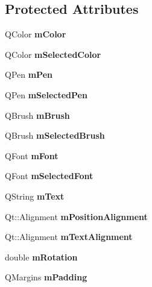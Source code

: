 \subsection*{Protected Attributes}
\begin{DoxyCompactItemize}
\item 
\hypertarget{class_q_c_p_item_text_a8407f284ad867f627878cc26ef433d08}{}\label{class_q_c_p_item_text_a8407f284ad867f627878cc26ef433d08} 
Q\+Color {\bfseries m\+Color}
\item 
\hypertarget{class_q_c_p_item_text_a7eb64e42f5f7998a97d8907ad25933c1}{}\label{class_q_c_p_item_text_a7eb64e42f5f7998a97d8907ad25933c1} 
Q\+Color {\bfseries m\+Selected\+Color}
\item 
\hypertarget{class_q_c_p_item_text_aa02388705dbbff1bf7b8aa872b5f579c}{}\label{class_q_c_p_item_text_aa02388705dbbff1bf7b8aa872b5f579c} 
Q\+Pen {\bfseries m\+Pen}
\item 
\hypertarget{class_q_c_p_item_text_a8eaec649606d6ead2d8d4dcb5691777c}{}\label{class_q_c_p_item_text_a8eaec649606d6ead2d8d4dcb5691777c} 
Q\+Pen {\bfseries m\+Selected\+Pen}
\item 
\hypertarget{class_q_c_p_item_text_a2535911875faa459b8337f2efccb5cb8}{}\label{class_q_c_p_item_text_a2535911875faa459b8337f2efccb5cb8} 
Q\+Brush {\bfseries m\+Brush}
\item 
\hypertarget{class_q_c_p_item_text_a28ccd097b42a216d81db9c6869f54a59}{}\label{class_q_c_p_item_text_a28ccd097b42a216d81db9c6869f54a59} 
Q\+Brush {\bfseries m\+Selected\+Brush}
\item 
\hypertarget{class_q_c_p_item_text_a1dc87fe2a824820d549ffd7e644eef8d}{}\label{class_q_c_p_item_text_a1dc87fe2a824820d549ffd7e644eef8d} 
Q\+Font {\bfseries m\+Font}
\item 
\hypertarget{class_q_c_p_item_text_a6702f141fae590b2f4f1ec02fe9f8bd5}{}\label{class_q_c_p_item_text_a6702f141fae590b2f4f1ec02fe9f8bd5} 
Q\+Font {\bfseries m\+Selected\+Font}
\item 
\hypertarget{class_q_c_p_item_text_a2dec3e08c11f51639629374ecec3bd62}{}\label{class_q_c_p_item_text_a2dec3e08c11f51639629374ecec3bd62} 
Q\+String {\bfseries m\+Text}
\item 
\hypertarget{class_q_c_p_item_text_a6c27f7dc1a962a04b32430cf99f04654}{}\label{class_q_c_p_item_text_a6c27f7dc1a962a04b32430cf99f04654} 
Qt\+::\+Alignment {\bfseries m\+Position\+Alignment}
\item 
\hypertarget{class_q_c_p_item_text_acdb2e50c38e83da00f083771efbd213f}{}\label{class_q_c_p_item_text_acdb2e50c38e83da00f083771efbd213f} 
Qt\+::\+Alignment {\bfseries m\+Text\+Alignment}
\item 
\hypertarget{class_q_c_p_item_text_ac37df0061552225d2277e1ee3b48f2cb}{}\label{class_q_c_p_item_text_ac37df0061552225d2277e1ee3b48f2cb} 
double {\bfseries m\+Rotation}
\item 
\hypertarget{class_q_c_p_item_text_ae7b3ef0ce6046efd4b346d28f2e1fb67}{}\label{class_q_c_p_item_text_ae7b3ef0ce6046efd4b346d28f2e1fb67} 
Q\+Margins {\bfseries m\+Padding}
\end{DoxyCompactItemize}
